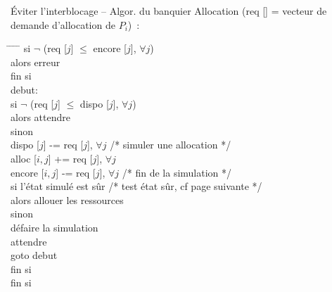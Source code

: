 \begin {frame} {Éviter l'interblocage -- Algor. du banquier}
    Allocation (req [] = vecteur de demande d'allocation de $P_i$)~:

    \footnotesize
    \begin {tabbing}
	\hspace* {3mm} \= \hspace* {3mm} \= \hspace* {3mm} \=
		\hspace* {40mm} \= \kill
	\> si $\neg$ (req [$j$] $\leq$ encore [$j$], $\forall j$) \\
	    \> \> alors erreur \\
	\> fin si \\
	debut: \\
	\> si $\neg$ (req [$j$] $\leq$ dispo [$j$], $\forall j$) \\
	\> alors attendre \\
	\> sinon \\
	\> \> dispo [$j$] -= req [$j$], $\forall j$
		\> \> /* simuler une allocation */ \\
	\> \> alloc [$i, j$] += req [$j$], $\forall j$ \\
	\> \> encore [$i, j$] -= req [$j$], $\forall j$
		\> \> /* fin de la simulation */ \\
	\> \> si l'état simulé est sûr
		\> \> /* test état sûr, cf page suivante */ \\
	\> \> alors allouer les ressources \\
	\> \> sinon \\
	\> \> \> défaire la simulation \\
	\> \> \> attendre \\
	\> \> \> goto debut \\
	\> \> fin si \\
	\> fin si \\
    \end {tabbing}
\end {frame}

